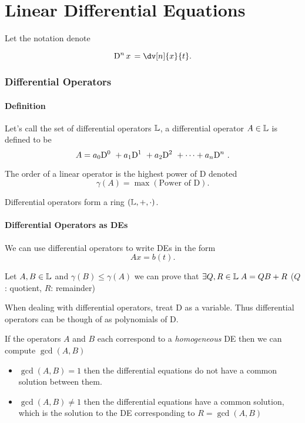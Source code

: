 \part{Linear Differential Equations}

Let the notation denote

\[
	\D[n]{x} = \dv[n]{x}{t}
	.\]

\section{Differential Operators}
\subsection{Definition}
Let's call the set of differential operators $\P$, a differential operator $A\in\P$ is defined to be
\[
	A = a_0\D[0]{} + a_1\D[1]{} + a_2\D[2]{} + \cdots + a_n\D[n]{}
	.\]

The order of a linear operator is the highest power of D denoted
\[
	\gamma(A) = \max(\text{Power of D})
	.\]

Differential operators form a ring $(\P,+,\cdot)$.\\

\subsection{Differential Operators as DEs}

We can use differential operators to write DEs in the form
\[
	Ax=b(t)
	.\]

Let $A,B\in\P$ and $\gamma(B)\leq\gamma(A)$ we can prove that $\exists Q,R\in\P\;A=QB+R$ ($Q$: quotient, $R$: remainder)

\begin{remark}
	When dealing with differential operators, treat D as a variable. Thus differential operators can be though of as polynomials of D.
\end{remark}

If the operators $A$ and $B$ each correspond to a \emph{homogeneous} DE then we can compute $\gcd(A,B)$
\begin{itemize}
	\item $\gcd(A,B)= 1$ then the differential equations do not have a common solution between them.
	\item $\gcd(A,B)\neq 1$ then the differential equations have a common solution, which is the solution to the DE corresponding to $R=\gcd(A,B)$
\end{itemize}

